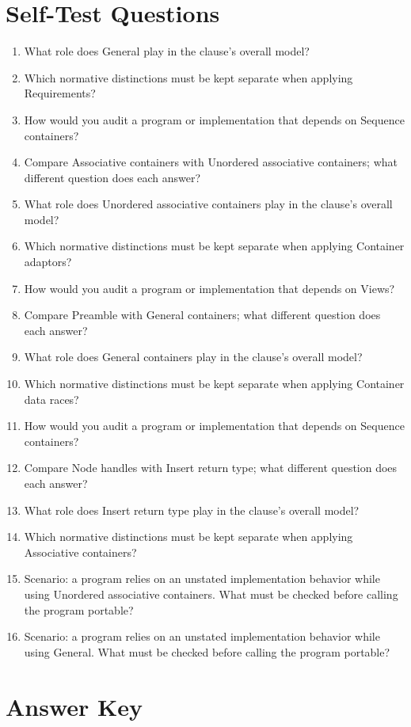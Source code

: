 \documentclass[11pt,letterpaper]{article}
\begin{document}
\section{Self-Test Questions}
\begin{enumerate}
\item What role does General play in the clause's overall model?
\item Which normative distinctions must be kept separate when applying Requirements?
\item How would you audit a program or implementation that depends on Sequence containers?
\item Compare Associative containers with Unordered associative containers; what different question does each answer?
\item What role does Unordered associative containers play in the clause's overall model?
\item Which normative distinctions must be kept separate when applying Container adaptors?
\item How would you audit a program or implementation that depends on Views?
\item Compare Preamble with General containers; what different question does each answer?
\item What role does General containers play in the clause's overall model?
\item Which normative distinctions must be kept separate when applying Container data races?
\item How would you audit a program or implementation that depends on Sequence containers?
\item Compare Node handles with Insert return type; what different question does each answer?
\item What role does Insert return type play in the clause's overall model?
\item Which normative distinctions must be kept separate when applying Associative containers?
\item Scenario: a program relies on an unstated implementation behavior while using Unordered associative containers. What must be checked before calling the program portable?
\item Scenario: a program relies on an unstated implementation behavior while using General. What must be checked before calling the program portable?
\end{enumerate}
\clearpage\section{Answer Key}
\end{document}
